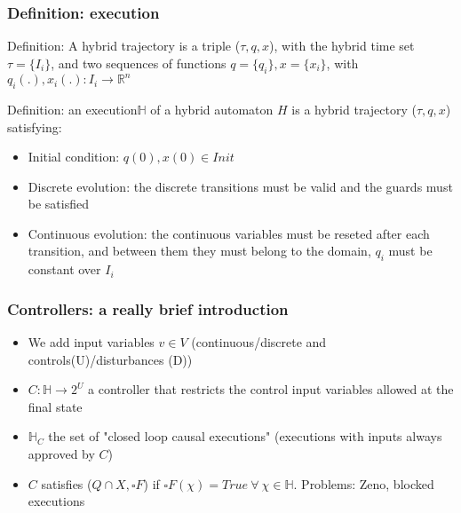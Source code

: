 \begin{frame}
	\frametitle{Definition: execution}
	
	Definition: A hybrid trajectory is a triple ($\tau,q,x$), with the hybrid time set $\tau = \{I_i\}$, and two sequences of functions $q = \{q_i\}, x = \{x_i\}$, with $q_i(.),x_i(.) : I_i \rightarrow \mathbb{R}^n$
	
	Definition: an execution$\mathbb{H}$ of a hybrid automaton $H$ is a hybrid trajectory ($\tau,q,x$) satisfying:
	\begin{itemize}
		\item Initial condition: $q(0),x(0) \in Init$
		\item Discrete evolution: the discrete transitions must be valid and the guards must be satisfied
		\item Continuous evolution: the continuous variables must be reseted after each transition, and between them they must belong to the domain, $q_i$ must be constant over $I_i$
	\end{itemize}
\end{frame}

\begin{frame}
	\frametitle{Controllers: a really brief introduction}
	
	\begin{itemize}
		\item We add input variables $v \in V$ (continuous/discrete and controls(U)/disturbances (D))
		\item $C : \mathbb{H} \rightarrow 2^U$ a controller that restricts the control input variables allowed at the final state
		\item $\mathbb{H}_C$ the set of "closed loop causal executions" (executions with inputs always approved by $C$)
		\item $C$ satisfies ($Q \cap X, \square F$) if $\square F(\chi) = True\ \forall\ \chi \in \mathbb{H}$. Problems: Zeno, blocked executions		
	\end{itemize}
\end{frame}

